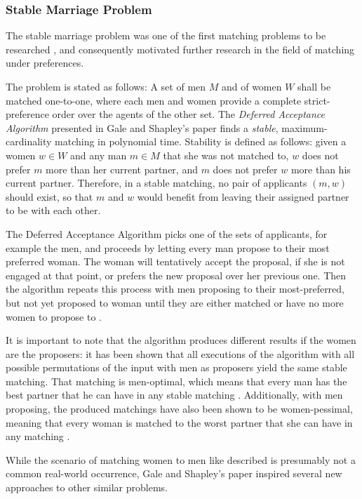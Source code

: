 \subsubsection{Stable Marriage Problem}\label{intro:stable-marriage}
The stable marriage problem was one of the first matching problems to be researched \cite{GaleShapleyOrig}, and consequently motivated further research in the field of matching under preferences.

The problem is stated as follows: A set of men $M$ and of women $W$ shall be matched one-to-one, where each men and women provide a complete strict-preference order over the agents of the other set. The \emph{Deferred Acceptance Algorithm} presented in Gale and Shapley's paper \cite{GaleShapleyOrig} finds a \emph{stable}, maximum-cardinality matching in polynomial time. Stability is defined as follows: given a women $w \in W$ and any man $m \in M$ that she was not matched to, $w$ does not prefer $m$ more than her current partner, and $m$ does not prefer $w$ more than his current partner. Therefore, in a stable matching, no pair of applicants $(m, w)$ should exist, so that $m$ and $w$ would benefit from leaving their assigned partner to be with each other.

The Deferred Acceptance Algorithm picks one of the sets of applicants, for example the men, and proceeds by letting every man propose to their most preferred woman. The woman will tentatively accept the proposal, if she is not engaged at that point, or prefers the new proposal over her previous one. Then the algorithm repeats this process with men proposing to their most-preferred, but not yet proposed to woman until they are either matched or have no more women to propose to \cite{Gusfield}.

It is important to note that the algorithm produces different results if the women are the proposers: it has been shown that all executions of the algorithm with all possible permutations of the input with men as proposers yield the same stable matching. That matching is men-optimal, which means that every man has the best partner that he can have in any stable matching \cite{Gusfield}. Additionally, with men proposing, the produced matchings have also been shown to be women-pessimal, meaning that every woman is matched to the worst partner that she can have in any matching \cite{Gusfield}.

While the scenario of matching women to men like described is presumably not a common real-world occurrence, Gale and Shapley's paper inspired several new approaches to other similar problems.

